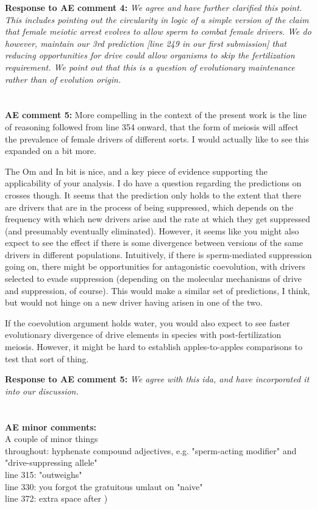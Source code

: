 \documentclass[12pt,letterpaper]{article}
\begin{document}
{\bf{Response to AE comment 4:}}  \emph{We agree and have further clarified this point. This includes pointing out the circularity in logic of a simple version of the claim that female meiotic arrest evolves to allow sperm to combat female drivers. We do however, maintain our 3rd prediction [line 249 in our first submission] that reducing opportunities for drive could allow organisms to skip the fertilization requirement. We point out that this is a question of evolutionary maintenance rather than of evolution origin.}
\\
\\
\\
{\bf{AE comment 5:}}
More compelling in the context of the present work is the line of reasoning followed from line 354 onward, that the form of meiosis will affect the prevalence of female drivers of different sorts. I would actually like to see this expanded on a bit more.

The Om and In bit is nice, and a key piece of evidence supporting the applicability of your analysis. I do have a question regarding the predictions on crosses though. It seems that the prediction only holds to the extent that there are drivers that are in the process of being suppressed, which depends on the frequency with which new drivers arise and the rate at which they get suppressed (and presumably eventually eliminated). However, it seems like you might also expect to see the effect if there is some divergence between versions of the same drivers in different populations. Intuitively, if there is sperm-mediated suppression going on, there might be opportunities for antagonistic coevolution, with drivers selected to evade suppression (depending on the molecular mechanisms of drive and suppression, of course). This would make a similar set of predictions, I think, but would not hinge on a new driver having arisen in one of the two.

If the coevolution argument holds water, you would also expect to see faster evolutionary divergence of drive elements in species with post-fertilization meiosis. However, it might be hard to establish apples-to-apples comparisons to test that sort of thing.

{\bf{Response to AE comment 5:}} \emph{We agree with this ida, and have incorporated it into our discussion.}
\\
\\
\\
{\bf{AE minor comments:}}
\\
A couple of minor things
\\
throughout: hyphenate compound adjectives, e.g. "sperm-acting modifier" and "drive-suppressing allele"
\\
line 315: "outweighs"
\\
line 330: you forgot the gratuitous umlaut on "naive"
\\
line 372: extra space after )
\end{document}
